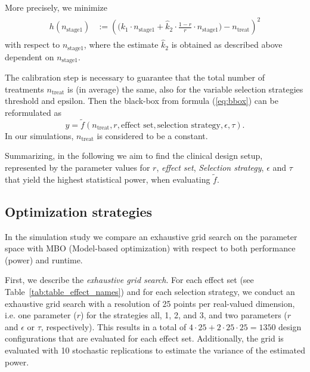 \documentclass[bimj,fleqn]{w-art}
\theoremstyle{plain}
\theoremstyle{definition}
\begin{document}
More precisely, we minimize
\begin{align}
  \label{eq:targettreat}
  \begin{split}
  h(n_{\text{stage1}}) &:= \left( \Big(k_1 \cdot n_{\text{stage1}} + \hat{k}_2 \cdot %
  \frac{1-r}{r} \cdot n_{\text{stage1}}
  \Big) - n_{\text{treat}} \right)^2
  \end{split}
\end{align}
with respect to $n_{\text{stage1}}$, where the estimate $\hat{k}_2$ is obtained as described above dependent on $n_{\text{stage1}}$. 

The calibration step is necessary to guarantee that the total number of treatments $n_{\text{treat}}$ is (in average) the same, also for the variable selection strategies $\text{threshold}$ and $\text{epsilon}$. Then the black-box from formula (\ref{eq:bbox}) can be reformulated as 
\begin{equation}
  y = \tilde{f}(n_{\text{treat}}, r, \text{effect set}, \text{selection strategy}, \epsilon, \tau).
\end{equation}
In our simulations, $n_{\text{treat}}$ is considered to be a constant.

Summarizing, in the following we aim to find the clinical design setup, represented by the parameter values for $r$, \emph{effect set}, \emph{Selection strategy}, $\epsilon$ and $\tau$ that yield the highest statistical power, when evaluating $\tilde{f}$.

\subsection{Optimization strategies}

In the simulation study we compare an exhaustive grid search on the parameter space with MBO (Model-based optimization) with respect to both performance (power) and runtime.

First, we describe the \emph{exhaustive grid search}.
For each effect set (see Table~\ref{tab:table_effect_names}) and for each selection strategy, we conduct an exhaustive grid search with a resolution of 25 points per real-valued dimension, i.e. one parameter ($r$) for the strategies all, 1, 2, and 3, and two parameters ($r$ and $\epsilon$ or $\tau$, respectively).
This results in a total of $4 \cdot 25 + 2 \cdot 25 \cdot 25 = 1350$ design configurations that are evaluated for each effect set.
Additionally, the grid is evaluated with 10 stochastic replications to estimate the variance of the estimated power.
\end{document}

